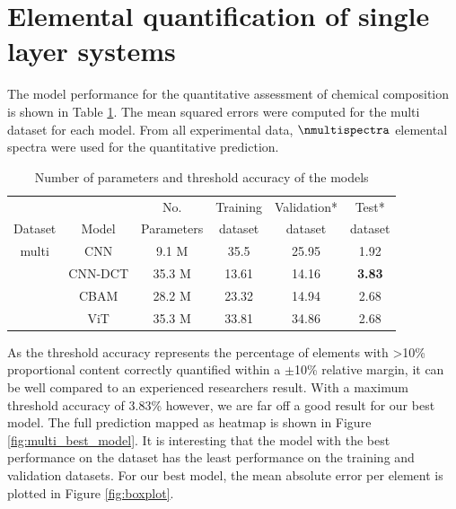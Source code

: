\section{Elemental quantification of single layer systems}

The model performance for the quantitative assessment of chemical composition is shown in Table \ref{tab:acc_quant}. The mean squared errors were computed for the multi dataset for each model.
From all experimental data, $\nmultispectra$ elemental spectra were used for the quantitative prediction. 

\begin{table}[H]
    \centering
    \begin{tabular}{c|c|c|c|c|c}
        &    & No.  & Training & Validation*  & Test*    \\
         Dataset   & Model&Parameters &                           dataset & dataset & dataset         \\
        \hline
        multi  & CNN     &   9.1 M        &     35.5       &   25.95                 &  1.92      \\
               & CNN-DCT &  35.3 M        &    13.61          &    14.16            &   \textbf{3.83}   \\
               & CBAM    & 28.2 M         &    23.32         &    14.94             &  2.68   \\ %
               & ViT     &   35.3 M     &    33.81       &      34.86    &   2.68        \\
    \end{tabular}
    \caption{Number of parameters and threshold accuracy of the models}
    \label{tab:acc_quant}
\end{table}

As the threshold accuracy represents the percentage of elements with >10\% proportional content correctly quantified within a $\pm$10\% relative margin, it can be well compared to an experienced researchers result. With a maximum threshold accuracy of 3.83\% however, we are far off a good result for our best model. The full prediction mapped as heatmap is shown in Figure \ref{fig:multi_best_model}. It is interesting that the model with the best performance on the dataset has the least performance on the training and validation datasets. For our best model, the mean absolute error per element is plotted in Figure \ref{fig:boxplot}.

